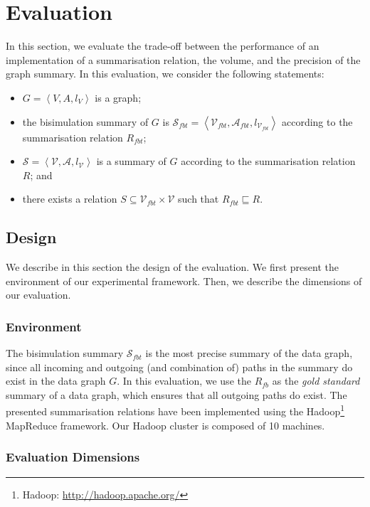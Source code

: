 \section{Evaluation}
\label{sec:eval}

In this section, we evaluate the trade-off between the performance of an implementation of a summarisation relation, the volume, and the precision of the graph summary.
In this evaluation, we consider the following statements:
\begin{itemize}
	\item $G=\left\langle V, A, l_V \right\rangle$ is a graph;
	\item the bisimulation summary of $G$ is $\mathcal{S}_{fbt} = \left\langle \mathcal{V}_{fbt}, \mathcal{A}_{fbt}, l_{\mathcal{V}_{fbt}} \right\rangle$ according to the summarisation relation $R_{fbt}$;
	\item $\mathcal{S} = \left\langle \mathcal{V}, \mathcal{A}, l_{\mathcal{V}} \right\rangle$ is a summary of $G$ according to the summarisation relation $R$; and
	\item there exists a relation $S \subseteq \mathcal{V}_{fbt} \times \mathcal{V}$ such that $R_{fbt} \sqsubseteq R$.
\end{itemize}

\subsection{Design}
\label{sec:eval:design}

We describe in this section the design of the evaluation. We first present the environment of our experimental framework. Then, we describe the dimensions of our evaluation.

\subsubsection{Environment}

The bisimulation summary $\mathcal{S}_{fbt}$ is the most precise summary of the data graph, since all incoming and outgoing (and combination of) paths in the summary do exist in the data graph $G$. In this evaluation, we use the $R_{fb}$ as the \emph{gold standard} summary of a data graph, which ensures that all outgoing paths do exist. The presented summarisation relations have been implemented using the Hadoop\footnote{Hadoop: \url{http://hadoop.apache.org/}} MapReduce framework. Our Hadoop cluster is composed of 10 machines.

\subsubsection{Evaluation Dimensions}

